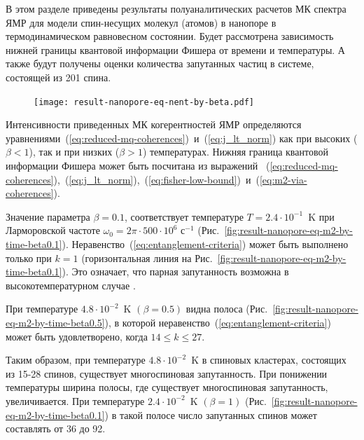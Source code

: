В этом разделе приведены результаты полуаналитических расчетов МК спектра ЯМР
для модели спин-несущих молекул (атомов) в нанопоре в термодинамическом равновесном состоянии.
Будет рассмотрена зависимость нижней границы квантовой информации Фишера от времени и температуры.
А также будут получены оценки количества запутанных частиц в системе,
состоящей из 201 спина.

\begin{figure}
  \centering
  \texttt{[image: result-nanopore-eq-nent-by-beta.pdf]}
  \caption{\protect}
  \label{fig:result-nanopore-eq-nent-by-beta}
\end{figure}

Интенсивности приведенных МК когерентностей  ЯМР определяются уравнениями~(\ref{eq:reduced-mq-coherences})~и~(\ref{eq:j_lt_norm}) как при высоких ($\beta < 1$), так и при низких ($\beta > 1$) температурах.
Нижняя граница квантовой информации Фишера может быть посчитана из выражений
~(\ref{eq:reduced-mq-coherences}),~(\ref{eq:j_lt_norm}),~(\ref{eq:fisher-low-bound})~и~(\ref{eq:m2-via-coherences}).

Значение параметра $\beta = 0.1$, соответствует температуре ${T= 2.4\cdot 10^{-1}}$~K при Ларморовской частоте $\omega_0 = 2\pi\cdot 500\cdot10^6$ с$^{-1}$ (Рис.~\ref{fig:result-nanopore-eq-m2-by-time-beta0.1}).
Неравенство~(\ref{eq:entanglement-criteria}) может быть выполнено только при $k=1$ (горизонтальная линия на Рис.~\ref{fig:result-nanopore-eq-m2-by-time-beta0.1}).
Это означает, что парная запутанность возможна в высокотемпературном случае \cite{Feldman2012}.

При температуре ${4.8\cdot10^{-2}}$~K {$(\beta=0.5)$} видна полоса (Рис.~\ref{fig:result-nanopore-eq-m2-by-time-beta0.5}), в которой неравенство~(\ref{eq:entanglement-criteria}) может быть удовлетворено, когда $14 \leq k \leq 27$.

Таким образом, при температуре ${4.8\cdot10^{-2}}$~K в спиновых кластерах, состоящих из 15-28 спинов, существует многоспиновая запутанность. При понижении температуры ширина полосы, где существует многоспиновая запутанность, увеличивается. При температуре ${2.4\cdot10^{-2}}$~K $(\beta=1)$ (Рис.~\ref{fig:result-nanopore-eq-m2-by-time-beta0.1}) в такой полосе число запутанных спинов может составлять от 36 до 92.

